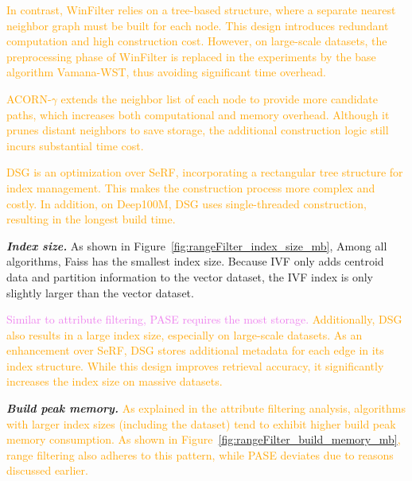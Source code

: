 \documentclass[sigconf, nonacm]{acmart}
\begin{document}
{		\textcolor{orange}{
	In contrast, WinFilter relies on a tree-based structure, where a separate nearest neighbor graph must be built for each node. This design introduces redundant computation and high construction cost. However, on large-scale datasets, the preprocessing phase of WinFilter is replaced in the experiments by the base algorithm Vamana-WST, thus avoiding significant time overhead.}
	
		\textcolor{orange}{
	ACORN-\(\gamma\)  extends the neighbor list of each node to provide more candidate paths, which increases both computational and memory overhead. Although it prunes distant neighbors to save storage, the additional construction logic still incurs substantial time cost.}
	
	
		\textcolor{orange}{
	DSG is an optimization over SeRF, incorporating a rectangular tree structure for index management. This makes the construction process more complex and costly. In addition, on Deep100M, DSG uses single-threaded construction, resulting in the longest build time.}
	
	\textit{\textbf{Index size.}} 
	As shown in Figure~\ref{fig:rangeFilter_index_size_mb}, Among all algorithms, Faiss has the smallest index size. Because IVF only adds centroid data and partition information to the vector dataset, the IVF index is only slightly larger than the vector dataset.

	
	\textcolor{violet}{Similar to attribute filtering, PASE requires the most storage. }
	\textcolor{orange}{Additionally, DSG also results in a large index size, especially on large-scale datasets. As an enhancement over SeRF, DSG stores additional metadata for each edge in its index structure. While this design improves retrieval accuracy, it significantly increases the index size on massive datasets.}
	
	
	\textit{\textbf{Build peak memory.}}  
	\textcolor{orange}{As explained in the attribute filtering analysis, algorithms with larger index sizes (including the dataset) tend to exhibit higher build peak memory consumption. As shown in Figure~\ref{fig:rangeFilter_build_memory_mb}, range filtering also adheres to this pattern, while PASE deviates due to reasons discussed earlier.}  
	
}
\end{document}
